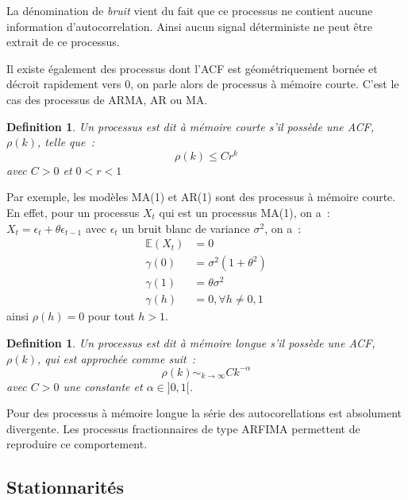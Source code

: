 \documentclass[11pt]{scrartcl} %
\newtheorem{Def}[theorem]{Definition}
\newcommand{\E}[1]{\mathbb{E}\left(#1\right)}
\begin{document}
La dénomination de \textit{bruit} vient du fait que ce processus ne contient aucune information d'autocorrelation. Ainsi aucun signal déterministe ne peut être extrait de ce processus. 


Il existe également des processus dont l'ACF est géométriquement bornée et décroit rapidement vers 0, on parle alors de processus à mémoire courte. C'est le cas des processus de ARMA, AR ou MA.
\begin{Def}\label{defCourte}
Un processus est dit à mémoire courte s'il possède une ACF, $\rho(k)$, telle que~:
$$
\rho(k)\leq Cr^{k}
$$
avec $C>0$ et $0<r<1$
\end{Def}
Par exemple, les modèles MA(1) et AR(1) sont des processus à mémoire courte. En effet, pour un processus $X_t$ qui est un processus MA(1), on a~:~$X_t=\epsilon_t+\theta\epsilon_{t-1}$ avec $\epsilon_t$ un bruit blanc de variance $\sigma^2$, on a~:
\begin{align*}
\E{X_t}&=0\\
\gamma(0)&=\sigma^2(1+\theta^2)\\
\gamma(1) &= \theta\sigma^2\\
\gamma(h)&= 0, \forall h\not=0,1
\end{align*}
ainsi $\rho(h)=0$ pour tout $h>1$.
\begin{Def}
Un processus est dit à mémoire longue s'il possède une ACF, $\rho(k)$, qui est approchée comme suit~:
$$
\rho(k)\sim_{k\rightarrow \infty} Ck^{-\alpha}
$$
avec $C>0$ une constante et $\alpha\in ]0,1[$.
\end{Def}
Pour des processus à mémoire longue la série des autocorellations est absolument divergente. Les processus fractionnaires de type ARFIMA permettent de reproduire ce comportement.

\subsection{Stationnarités}
\end{document}
